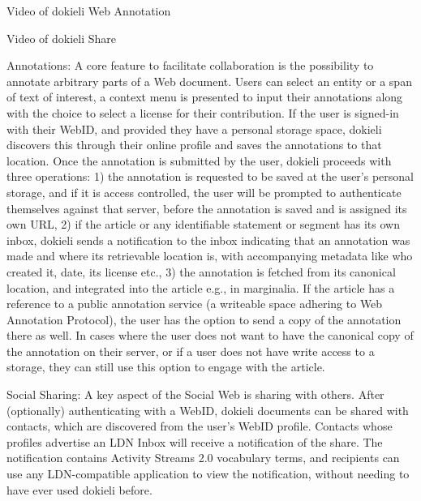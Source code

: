 \documentclass[a4paper]{llncs}
\begin{document}
                                        
                                        \empty Video of dokieli Web Annotation
                                    

                                    
                                        
                                            
                                        
                                        \empty Video of dokieli Share
                                    
                                    

                                    
\par Annotations: A core feature to facilitate collaboration is the possibility to annotate arbitrary parts of a Web document.
                                    Users can select an entity or a span of text of interest, a context menu is presented to input their annotations along with the choice to select a license for their contribution.
                                    If the user is signed-in with their WebID, and provided they have a personal storage space, dokieli discovers this through their online profile and saves the annotations to that location.
                                    Once the annotation is submitted by the user, dokieli proceeds with three operations: 1) the annotation is requested to be saved at the user’s personal storage, and if it is access controlled, the user will be prompted to authenticate themselves against that server, before the annotation is saved and is assigned its own URL, 2) if the article or any identifiable statement or segment has its own inbox, dokieli sends a notification to the inbox indicating that an annotation was made and where its retrievable location is, with accompanying metadata like who created it, date, its license etc., 3) the annotation is fetched from its canonical location, and integrated into the article e.g., in marginalia. If the article has a reference to a public annotation service (a writeable space adhering to \empty Web Annotation Protocol), the user has the option to send a copy of the annotation there as well. In cases where the user does not want to have the canonical copy of the annotation on their server, or if a user does not have write access to a storage, they can still use this option to engage with the article.
                                    

                                    
\par Social Sharing: A key aspect of the Social Web is sharing with others.
                                    After (optionally) authenticating with a WebID, dokieli documents can be shared with contacts, which are discovered from the user’s WebID profile. Contacts whose profiles advertise an LDN Inbox will receive a notification of the share. The notification contains Activity Streams 2.0 vocabulary terms, and recipients can use any LDN-compatible application to view the notification, without needing to have ever used dokieli before.
                                    
\end{document}
